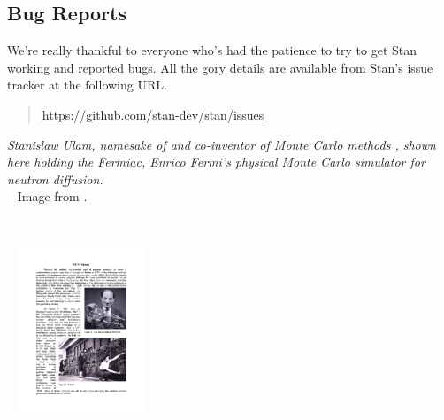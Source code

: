 \subsection*{Bug Reports}

We're really thankful to everyone who's had the patience to try
to get Stan working and reported bugs.  All the gory details are
available from Stan's issue tracker at the following URL.
%
\begin{quote}
\url{https://github.com/stan-dev/stan/issues}
\end{quote}




\vfill
\begin{center}
\hfill
\begin{minipage}[b]{2in}
  \footnotesize {\it Stanislaw Ulam, namesake of \Stan and co-inventor
    of Monte Carlo methods \citep{MetropolisUlam:1949}, shown here
    holding the Fermiac, Enrico Fermi's physical Monte Carlo simulator
    for neutron diffusion.}
  \\[3pt] \mbox{ } \hfill
  {\scriptsize Image from \citep{Giesler:2000}.}
\end{minipage} \ \ \ \ \
\begin{minipage}[b]{1.5in} \mbox{ } \hfill
  \includegraphics[width=1.5in]{img/ulam-fermiac.pdf}
\end{minipage}
\end{center}
